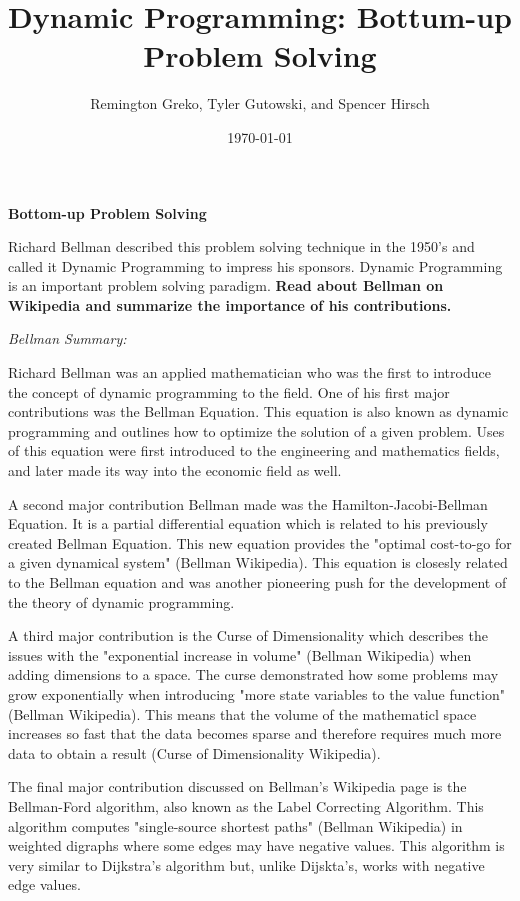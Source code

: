 \documentclass{article}
\begin{document}
\title{\textbf{Dynamic Programming: Bottum-up Problem Solving}}
\author{Remington Greko, Tyler Gutowski, and Spencer Hirsch}
\date{\today}

\maketitle

\noindent \textbf{Bottom-up Problem Solving} 


\noindent Richard Bellman described this problem solving technique in the
1950’s and called it Dynamic Programming to impress his sponsors.
Dynamic Programming is an important problem solving paradigm.
\textbf{Read about Bellman on Wikipedia and summarize the importance
of his contributions.}

\noindent \textit{Bellman Summary:}

Richard Bellman was an applied mathematician who was the first to 
introduce the concept of dynamic programming to the field. One of
his first major contributions was the Bellman Equation. This equation 
is also known as dynamic programming and outlines how to optimize
the solution of a given problem. Uses of this equation were first 
introduced to the engineering and mathematics fields, and later
made its way into the economic field as well.

A second major contribution Bellman made was the Hamilton-Jacobi-Bellman
Equation. It is a partial differential equation which is related to his
previously created Bellman Equation. This new equation provides the 
"optimal cost-to-go for a given dynamical system" (Bellman Wikipedia).
This equation is closesly related to the Bellman equation and was another
pioneering push for the development of the theory of dynamic programming.

A third major contribution is the Curse of Dimensionality which describes 
the issues with the "exponential increase in volume" (Bellman Wikipedia)
when adding dimensions to a space. The curse demonstrated how some 
problems may grow exponentially when introducing "more state variables 
to the value function" (Bellman Wikipedia). This means that the volume
of the mathematicl space increases so fast that the data becomes sparse
and therefore requires much more data to obtain a result (Curse of
Dimensionality Wikipedia).

The final major contribution discussed on Bellman's Wikipedia page is 
the Bellman-Ford algorithm, also known as the Label Correcting Algorithm.
This algorithm computes "single-source shortest paths" (Bellman Wikipedia)
in weighted digraphs where some edges may have negative values. This 
algorithm is very similar to Dijkstra's algorithm but, unlike Dijskta's, 
works with negative edge values.
\end{document}
